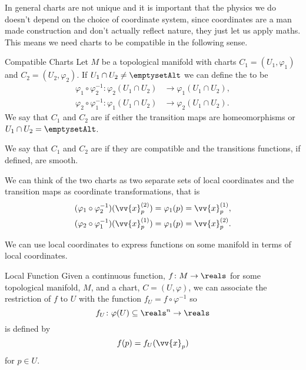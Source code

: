 In general charts are not unique and it is important that the physics we do doesn't depend on the choice of coordinate system, since coordinates are a man made construction and don't actually reflect nature, they just let us apply maths.
This means we need charts to be compatible in the following sense.

\begin{dfn}{Compatible Charts}{}
    Let \(M\) be a topological manifold with charts \(C_1 = (U_1, \varphi_1)\) and \(C_2 = (U_2, \varphi_2)\).
    If \(U_1 \cap U_2 \ne \emptysetAlt\) we can define the  to be
    \begin{align}
        \varphi_1 \circ \varphi_2^{-1} \colon \varphi_2(U_1 \cap U_2) &\to \varphi_1(U_1 \cap U_2),\\
        \varphi_2 \circ \varphi_1^{-1} \colon \varphi_1(U_1 \cap U_2) &\to \varphi_2(U_1 \cap U_2).
    \end{align}
    We say that \(C_1\) and \(C_2\) are  if either the transition maps are homeomorphisms or \(U_1 \cap U_2 = \emptysetAlt\).
    
    We say that \(C_1\) and \(C_2\) are  if they are compatible and the transitions functions, if defined, are smooth.
\end{dfn}

We can think of the two charts as two separate sets of local coordinates and the transition maps as coordinate transformations, that is
\begin{align}
    (\varphi_1 \circ \varphi_2^{-1})(\vv{x}_p^{(2)}) &= \varphi_1(p) = \vv{x}_p^{(1)},\\
    (\varphi_2 \circ \varphi_1^{-1})(\vv{x}_p^{(1)}) &= \varphi_1(p) = \vv{x}_p^{(2)}.
\end{align}

We can use local coordinates to express functions on some manifold in terms of local coordinates.

\begin{dfn}{Local Function}{}
    Given a continuous function, \(f \colon M \to \reals\) for some topological manifold, \(M\), and a chart, \(C = (U, \varphi)\), we can associate the restriction of \(f\) to \(U\) with the function \(f_U = f \circ \varphi^{-1}\) so
    \begin{equation}
        f_U \colon \varphi(U) \subseteq \reals^n \to \reals
    \end{equation}
    is defined by
    \begin{equation}
        f(p) = f_U(\vv{x}_p)
    \end{equation}
    for \(p \in U\).
\end{dfn}

